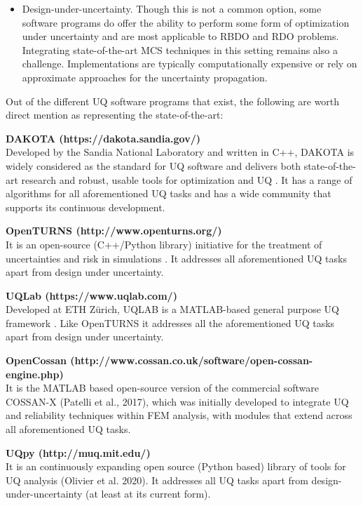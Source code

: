 \begin{itemize}
    \item Design-under-uncertainty. Though this is not a common option, some software programs do offer the ability to perform some form of optimization under uncertainty and are most applicable to RBDO and RDO problems. Integrating state-of-the-art MCS techniques in this setting remains also a challenge. Implementations are typically computationally expensive or rely on approximate approaches for the uncertainty propagation.
\end{itemize}

\noindent Out of the different UQ software programs that exist, the following are worth direct mention as representing the state-of-the-art: 
\newline

\noindent\textbf{DAKOTA (https://dakota.sandia.gov/)} \\Developed by the Sandia National Laboratory and written in C++, DAKOTA is widely considered as the standard for UQ software and delivers both state-of-the-art research and robust, usable tools for optimization and UQ \citep{adams2009dakota}. It has a range of algorithms for all aforementioned UQ tasks and has a wide community that supports its continuous development. 
\newline

\noindent\textbf{OpenTURNS (http://www.openturns.org/)} \\It is an open-source (C++/Python library) initiative for the treatment of uncertainties and risk in simulations \citep{andrianov2007open}. It addresses all aforementioned UQ tasks apart from design under uncertainty. 
\newline

\noindent\textbf{UQLab (https://www.uqlab.com/)} \\Developed at ETH Zürich, UQLAB is a MATLAB-based general purpose UQ framework \citep{marelli2014uqlab}. Like OpenTURNS it addresses all the aforementioned UQ tasks apart from design under uncertainty. 
\newline

\noindent\textbf{OpenCossan (http://www.cossan.co.uk/software/open-cossan-engine.php)} \\It is the MATLAB based open-source version of the commercial software COSSAN-X (Patelli et al., 2017), which was initially developed to integrate UQ and reliability techniques within FEM analysis, with modules that extend across all aforementioned UQ tasks.

\noindent\textbf{UQpy  (http://muq.mit.edu/)} \\It is an continuously expanding open source (Python based) library of tools for UQ analysis (Olivier et al. 2020). It addresses all UQ tasks apart from design-under-uncertainty (at least at its current form).

